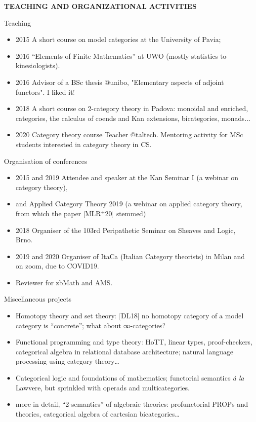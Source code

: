 \documentclass{beamer}
\begin{document}
%
%
%
%
%
\begin{frame}
  \Huge\centering \bfseries TEACHING AND ORGANIZATIONAL ACTIVITIES
\end{frame}
%
\begin{frame}{Teaching}\small
  \begin{itemize}
    \item<+-> 2015 A short course on \alert{model categories} at the University of Pavia;
    \item<+-> 2016 ``\alert{Elements of Finite Mathematics}'' at UWO (mostly statistics to kinesiologists).
    \item<+-> 2016 \alert{Advisor} of a BSc thesis @unibo, "Elementary aspects of adjoint functors". I liked it!
    \item<+-> 2018 A short course on \alert{2-category theory} in Padova: monoidal and enriched, categories, the calculus of coends and Kan extensions, bicategories, monads...
    \item<+-> 2020 \alert{Category theory} course Teacher @taltech. Mentoring activity for MSc students interested in category theory in CS.
\end{itemize}
\end{frame}
\begin{frame}{Organisation of conferences}\small
  \begin{itemize}
    \item<+-> 2015 and 2019 Attendee and speaker at the \alert{Kan Seminar I} (a webinar on category theory),
    \item<+-> and \alert{Applied Category Theory} 2019 (a webinar on applied category theory, from which the paper [\alert{MLR$^{+}$20}] stemmed)
    \item<+-> 2018 \alert{Organiser} of the 103rd Peripathetic Seminar on Sheaves and Logic, Brno.
    \item<+-> 2019 and 2020 \alert{Organiser} of ItaCa (\alert{Ita}lian \alert{Ca}tegory theorists) in Milan and on zoom, due to COVID19.
    \item<+-> Reviewer for zbMath and AMS.
  \end{itemize}
\end{frame}
%
%
%
%
%
%
%
\begin{frame}{Miscellaneous projects}
\small
\begin{itemize}
  \item<+-> Homotopy theory and set theory: [\alert{DL18}] no homotopy category of a model category is ``concrete''; what about ∞-categories?
  \item<+-> Functional programming and type theory: HoTT, linear types, proof-checkers, categorical algebra in relational database architecture; natural language processing using category theory\dots
  \item<+-> Categorical logic and foundations of mathematics; functorial semantics \emph{à la} Lawvere, but sprinkled with operads and multicategories.
  \item<+-> more in detail, ``2-semantics'' of algebraic theories: profunctorial PROPs and theories, categorical algebra of cartesian bicategories\dots
\end{itemize}
\end{frame}
\end{document}

